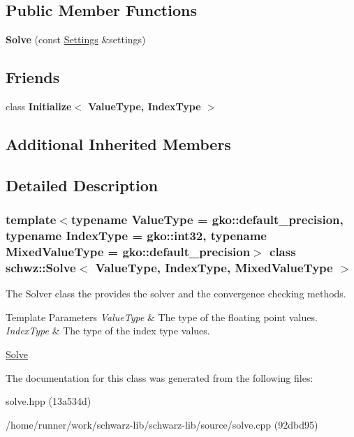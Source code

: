 \subsection*{Public Member Functions}
\begin{DoxyCompactItemize}
\item 
\mbox{\label{classschwz_1_1Solve_a667e6b9674ec54bb95152c8f263f1467}} 
{\bfseries Solve} (const \hyperlink{structschwz_1_1Settings}{Settings} \&settings)
\end{DoxyCompactItemize}
\subsection*{Friends}
\begin{DoxyCompactItemize}
\item 
\mbox{\label{classschwz_1_1Solve_a7044b349fe5363eeace2d1a56b38f650}} 
class {\bfseries Initialize$<$ Value\+Type, Index\+Type $>$}
\end{DoxyCompactItemize}
\subsection*{Additional Inherited Members}


\subsection{Detailed Description}
\subsubsection*{template$<$typename Value\+Type = gko\+::default\+\_\+precision, typename Index\+Type = gko\+::int32, typename Mixed\+Value\+Type = gko\+::default\+\_\+precision$>$\newline
class schwz\+::\+Solve$<$ Value\+Type, Index\+Type, Mixed\+Value\+Type $>$}

The Solver class the provides the solver and the convergence checking methods. 


\begin{DoxyTemplParams}{Template Parameters}
{\em Value\+Type} & The type of the floating point values. \\
\hline
{\em Index\+Type} & The type of the index type values.\\
\hline
\end{DoxyTemplParams}
\hyperlink{group__solve}{Solve} 

The documentation for this class was generated from the following files\+:\begin{DoxyCompactItemize}
\item 
solve.\+hpp (13a534d)\item 
/home/runner/work/schwarz-\/lib/schwarz-\/lib/source/solve.\+cpp (92dbd95)\end{DoxyCompactItemize}
